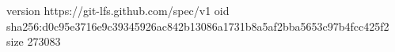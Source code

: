 version https://git-lfs.github.com/spec/v1
oid sha256:d0c95e3716e9c39345926ac842b13086a1731b8a5af2bba5653c97b4fcc425f2
size 273083
